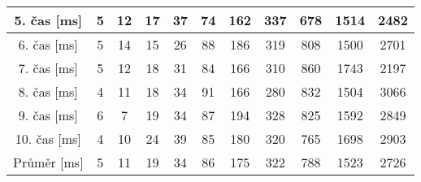 \documentclass{article}
\begin{document}
\begin{center}
\begin{table}[]
\begin{tabular}{|c|c|c|c|c|c|c|c|c|c|c|}
 		5. čas [ms]&  5&  12&  17&  37&  74&  162&  337&  678&  1514&  2482\\ \hline
 		6. čas [ms]&  5&  14&  15&  26&  88&  186&  319&  808&  1500&  2701\\ \hline
 		7. čas [ms]&  5&  12&  18&  31&  84&  166&  310&  860&  1743&  2197\\ \hline
 		8. čas [ms]&  4&  11&  18&  34&  91&  166&  280&  832&  1504&  3066\\ \hline
 		9. čas [ms]&  6&   7 &  19&  34&  87&  194&  328&  825&  1592&  2849\\ \hline
		10. čas [ms]& 4& 10& 24&  39&  85&  180&  320&  765&  1698&  2903\\ \hline \hline
 		Průměr [ms]& 5 &11  & 19 & 34 & 86 &175  & 322 & 788 & 1523 & 2726 \\ \hline
	\end{tabular}
	\end{table}
\end{center}
\end{document}
